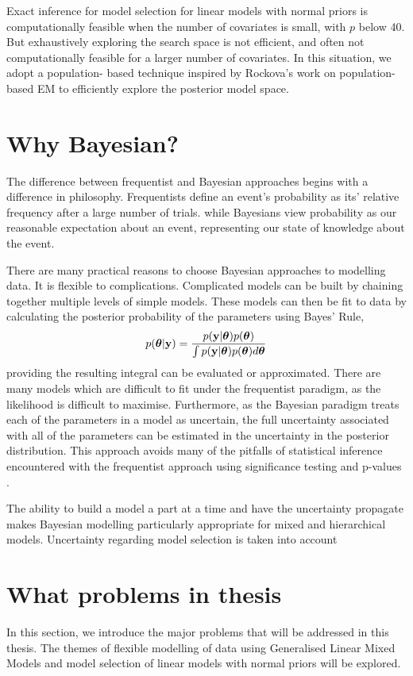Exact inference for model selection for linear models with normal priors is computationally feasible when the
number of  covariates is small, with $p$ below 40. But exhaustively exploring the search space is not
efficient, and often not computationally feasible for a larger number of covariates. In this situation, we
adopt a population- based technique inspired by Rockova's work on population-based EM to efficiently explore
the posterior model space.

\section{Why Bayesian?}
The difference between frequentist and Bayesian approaches begins with a difference in philosophy.
Frequentists define an event's probability as its' relative frequency after a large number of trials.
while Bayesians view probability as our reasonable expectation about an event, representing our state of knowledge about the event.

There are many practical reasons to choose Bayesian approaches to modelling data.
It is flexible to complications. Complicated models can be built by chaining together multiple levels of
simple models. These models can then be fit to data by calculating the posterior probability of the
parameters using Bayes' Rule,
\[
	p({\boldsymbol \theta} | {\bf y}) = \frac{p({\bf y} | {\boldsymbol \theta}) p({\boldsymbol \theta})}{\int p({\bf y} | {\boldsymbol \theta}) p({\boldsymbol \theta}) d {\boldsymbol \theta}}
\]
providing the resulting integral can be evaluated or approximated. There are many models which are difficult
to fit under the frequentist paradigm, as the likelihood is difficult to maximise. Furthermore, as the
Bayesian paradigm treats each of the parameters in a model as uncertain, the full uncertainty associated with
all of the parameters can be estimated in the uncertainty in the posterior distribution. This approach avoids
many of the pitfalls of statistical inference encountered with the frequentist approach using significance
testing and p-values \citep{Cox2005}.


The ability to build a model a part at a time and have the uncertainty propagate makes Bayesian modelling 
particularly appropriate for mixed and hierarchical models.
Uncertainty regarding model selection is taken into account

\section{What problems in thesis}

In this section, we introduce the major problems that will be addressed in this thesis. The themes of flexible
modelling of data using Generalised Linear Mixed Models and model selection of linear models with normal
priors  will be explored.

